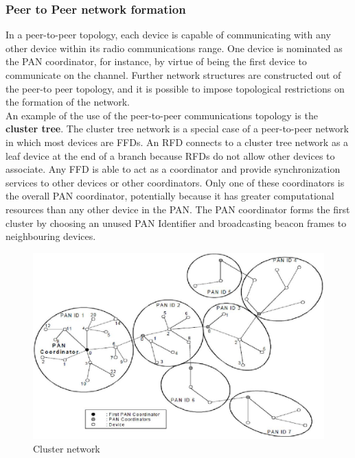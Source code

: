 \subsubsection{Peer to Peer network formation}
In a peer-to-peer topology, each device is capable of communicating with any other device within its radio communications range. One device is nominated as the PAN coordinator, for instance, by virtue of being the first device to communicate on the channel. Further network structures are constructed out of the peer-to peer topology, and it is possible to impose topological restrictions on the formation of the network.\\
An example of the use of the peer-to-peer communications topology is the \textbf{cluster tree}. The cluster tree network is a special case of a peer-to-peer network in which most devices are FFDs. An RFD connects to a cluster tree network as a leaf device at the end of a branch because RFDs do not allow other devices to associate. Any FFD is able to act as a coordinator and provide synchronization services to other devices or other coordinators. Only one of these coordinators is the overall PAN coordinator, potentially because it has greater computational resources than any other device in the PAN. The PAN coordinator forms the first cluster by choosing an unused PAN Identifier and broadcasting beacon frames to neighbouring devices.
\begin{figure}[ht]
	\centering
	\includegraphics[scale=0.4]{images/cluster_tree.png}
	\caption{Cluster network}
\end{figure}
